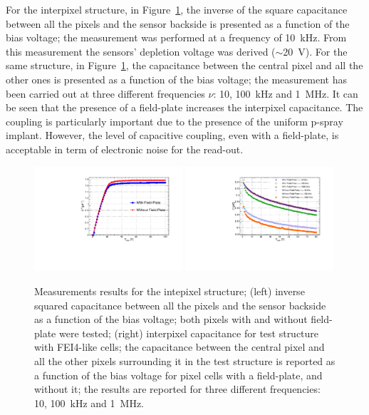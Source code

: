 For the interpixel structure, in Figure~\ref{fig:cv-testpixels}, the inverse of the square
 capacitance between all the pixels and the sensor backside is presented
 as a function of the bias voltage; the measurement was performed at a frequency of 10~kHz. From this measurement the sensors' depletion voltage was derived ($\sim$20~V).
For the same structure, in Figure~\ref{fig:cv-testpixels}, the capacitance between the central pixel and  all the other ones 
 is presented as a function of the bias voltage; the measurement has been carried out at three different frequencies $\nu$: 10, 100~kHz and 1~MHz.
  It can be seen that the presence of a field-plate increases the interpixel capacitance. The coupling is particularly important due 
 to the presence of the uniform p-spray implant. However, the level of capacitive coupling, even with  a field-plate, is acceptable in term of electronic noise for the read-out.



\begin{figure}[tbp]
\begin{center}
\includegraphics[width=0.49\textwidth]{edgelessC-2V.pdf}
\includegraphics[width=0.49\textwidth]{edgelessInterpixelCV.pdf}
\caption{\label{fig:cv-testpixels}Measurements results for the intepixel structure; (left) inverse squared capacitance between all the  pixels and the sensor backside as a function of
the bias voltage; both pixels with  and without field-plate were tested; (right)
 interpixel capacitance for test structure with FEI4-like cells; the capacitance between the central pixel and
all the other pixels surrounding it in the test structure  is reported as a function of
the bias voltage for pixel cells with a field-plate, and
without it; the results are reported for three different frequencies: 10, 100~kHz and 1~MHz.}
\end{center}
\end{figure}

